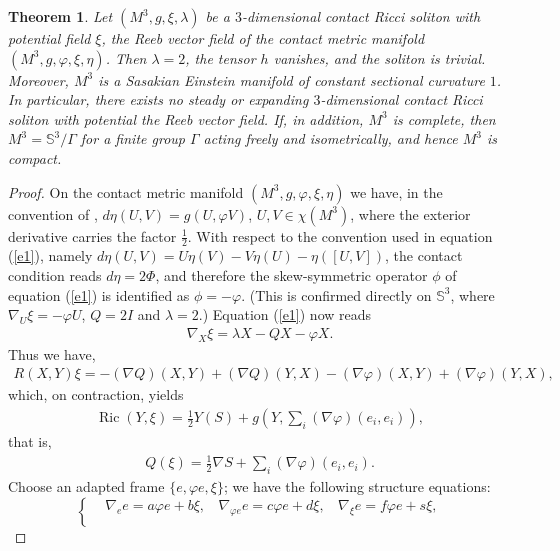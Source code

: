 \documentclass[a4paper, twoside, 10pt]{article}
\numberwithin{equation}{section}
\newtheorem{theorem}{Theorem}[section]
\theoremstyle{definition}
\begin{document}
\begin{theorem}\label{t:contact}
Let $(M^3, g, \xi, \lambda)$ be a $3$-dimensional contact Ricci
soliton with potential field $\xi$, the Reeb vector field of the
contact metric manifold $(M^3, g, \varphi, \xi, \eta)$. Then
$\lambda = 2$, the tensor $h$ vanishes, and the soliton is trivial.
Moreover, $M^3$ is a Sasakian Einstein manifold of constant sectional
curvature $1$. In particular, there exists no steady or expanding
$3$-dimensional contact Ricci soliton with potential the Reeb vector
field. If, in addition, $M^3$ is complete, then
$M^3=\mathbb{S}^3/\Gamma$ for a finite group $\Gamma$ acting freely and
isometrically, and hence $M^3$ is compact.
\end{theorem}
\begin{proof}
On the contact metric manifold $(M^3, g, \varphi, \xi, \eta)$ we have,
in the convention of \cite{blair2002riemannian},
$d\eta(U,V) = g(U, \varphi V)$, $U, V \in \chi(M^3)$, where the
exterior derivative carries the factor $\frac{1}{2}$. With respect to
the convention used in equation (\ref{e1}), namely
$d\eta(U,V) = U\eta(V) - V\eta(U) - \eta([U,V])$, the contact
condition reads $d\eta = 2\Phi$, and therefore the skew-symmetric
operator $\phi$ of equation (\ref{e1}) is identified as
$\phi = -\varphi$. (This is confirmed directly on $\mathbb{S}^3$,
where $\nabla_U \xi = -\varphi U$, $Q = 2I$ and $\lambda = 2$.)
Equation (\ref{e1}) now reads
\begin{eqnarray}\label{m3}
{\nabla}_{X} \xi = \lambda X - QX - \varphi X.
\end{eqnarray}
Thus we have,
\begin{eqnarray}\label{m4}
R(X,Y)\xi = - (\nabla Q)(X,Y) + (\nabla Q)(Y, X)
- (\nabla \varphi) (X,Y) + (\nabla \varphi) (Y,X),
\end{eqnarray}
which, on contraction, yields
\begin{eqnarray}\label{m5}
\operatorname{Ric}(Y, \xi) = \frac{1}{2}Y(S) + g\left(Y, {\sum}_{i}
(\nabla \varphi)(e_i, e_i)\right),
\end{eqnarray}
that is,
\begin{eqnarray}\label{m6}
Q(\xi) = \frac{1}{2} \nabla S + \sum_{i}(\nabla \varphi )(e_i, e_i).
\end{eqnarray}
Choose an adapted frame $\{e, \varphi e, \xi\}$; we have the
following structure equations:
\begin{equation}\label{m7}
    \begin{cases}
       & \nabla_ee= a \varphi e +b \xi,~~~~ \nabla_{\varphi e} e=c \varphi e+ d\xi,~~~~ \nabla_\xi e= f \varphi e + s \xi,  \\

\end{cases}
\end{equation}
\end{proof}
\end{document}
